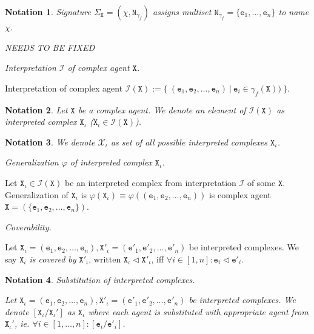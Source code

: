 \documentclass{elsarticle}
\newtheorem{notation}{Notation}
\begin{document}
\begin{notation}
Signature $\Sigma_\mathtt{X} = (\chi, \mathtt{N}_{\gamma_f})$ assigns multiset $\mathtt{N}_{\gamma_f} = \{\mathtt{e}_1, \ldots, \mathtt{e}_n\}$ to name $\chi$. 

NEEDS TO BE FIXED
\end{notation}

\begin{definition}
\textit{Interpretation $\mathcal{I}$ of complex agent $\mathtt{X}$.}

Interpretation of complex agent $\mathcal{I}(\mathtt{X}) := \{ ~(\mathtt{e}_1, \mathtt{e}_2, \ldots, \mathtt{e}_n) ~|~ \mathtt{e}_i \in \gamma_f(\mathtt{X})) ~\}$.
\end{definition}

\begin{notation}
Let $\mathtt{X}$ be a complex agent. We denote an element of $\mathcal{I}(\mathtt{X})$ as interpreted complex $\mathtt{X}_\iota$ ($\mathtt{X}_\iota \in \mathcal{I}(\mathtt{X})$).
\end{notation}

\begin{notation}
We denote $\mathcal{X}_\iota$ as set of all possible interpreted complexes $\mathtt{X}_\iota$.
\end{notation}

\begin{definition}
\textit{Generalization $\varphi$ of interpreted complex $\mathtt{X}_\iota$.}

Let $\mathtt{X}_\iota \in \mathcal{I}(\mathtt{X})$ be an interpreted complex from interpretation $\mathcal{I}$ of some $\mathtt{X}$. Generalization of $\mathtt{X}_\iota$ is $\varphi(\mathtt{X}_\iota) \equiv \varphi((\mathtt{e}_1, \mathtt{e}_2, \ldots, \mathtt{e}_n))$ is complex agent $\mathtt{X} = (\{ \mathtt{e}_1, \mathtt{e}_2, \ldots, \mathtt{e}_n \})$.
\end{definition}

\begin{definition}
\textit{Coverability.}

Let $\mathtt{X}_\iota = (\mathtt{e}_1, \mathtt{e}_2, \ldots, \mathtt{e}_n),\mathtt{X'}_\iota = (\mathtt{e'}_1, \mathtt{e'}_2, \ldots, \mathtt{e'}_n)$ be interpreted complexes. We say $\mathtt{X}_\iota$ \emph{is covered by} $\mathtt{X'}_\iota$, written $\mathtt{X}_\iota \lhd \mathtt{X'}_\iota$, iff $\forall i \in [1, n]: \mathtt{e}_i \lhd \mathtt{e'}_i$. 
\end{definition}

\begin{notation}
\textit{Substitution of interpreted complexes.} 

Let $\mathtt{X}_\iota = (\mathtt{e}_1, \mathtt{e}_2, \ldots, \mathtt{e}_n),\mathtt{X'}_\iota = (\mathtt{e'}_1, \mathtt{e'}_2, \ldots, \mathtt{e'}_n)$ be interpreted complexes. We denote $[\mathtt{X}_\iota/\mathtt{X}_\iota']$ as $\mathtt{X}_\iota$ where each agent is substituted with appropriate agent from $\mathtt{X}_\iota'$, ie. $\forall i \in [1, \ldots , n]: [\mathtt{e}_i/\mathtt{e'}_i]$.
\end{notation}
\end{document}
